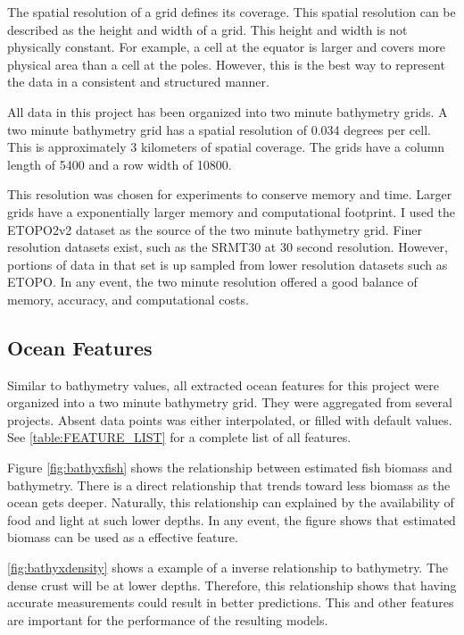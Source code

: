 \par
The spatial resolution of a grid defines its coverage.
This spatial resolution can be described as the height and width of a grid.
This height and width is not physically constant.
For example, a cell at the equator is larger and covers more physical area than a cell at the poles.
However, this is the best way to represent the data in a consistent and structured manner.

\par
All data in this project has been organized into two minute bathymetry grids.
A two minute bathymetry grid has a spatial resolution of 0.034 degrees per cell.
This is approximately 3 kilometers of spatial coverage.
The grids have a column length of 5400 and a row width of 10800.

\par
This resolution was chosen for experiments to conserve memory and time.
Larger grids have a exponentially larger memory and computational footprint.
I used the \ac{ETOPO}2v2 \cite{national1988etopo} dataset as the source of the two minute bathymetry grid.
Finer resolution datasets exist, such as the SRMT30 \cite{becker2009global} at 30 second resolution.
However, portions of data in that set is up sampled from lower resolution datasets such as ETOPO.
In any event, the two minute resolution offered a good balance of memory, accuracy, and computational costs.

\subsection{Ocean Features}
Similar to bathymetry values, all extracted ocean features for this project were organized into a two minute bathymetry grid.
They were aggregated from several projects.
Absent data points was either interpolated, or filled with default values.
See \ref{table:FEATURE_LIST} for a complete list of all features.

\par
Figure \ref{fig:bathyxfish} shows the relationship between estimated fish biomass and bathymetry.
There is a direct relationship that trends toward less biomass as the ocean gets deeper.
Naturally, this relationship can explained by the availability of food and light at such lower depths.
In any event, the figure shows that estimated biomass can be used as a effective feature.


\par
\ref{fig:bathyxdensity} shows a example of a inverse relationship to bathymetry.
The dense crust will be at lower depths.
Therefore, this relationship shows that having accurate measurements could result in better predictions.
This and other features are important for the performance of the resulting models.


